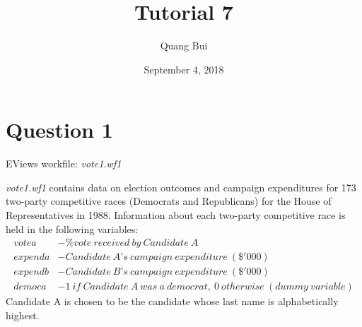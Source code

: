 \documentclass[12pt]{report}
\title{Tutorial 7}
\subtitle
{
	\textbf{keywords}: level log interpretation, dummy variables, hypothesis test, F-test, t-test, p-value, overall significance, individual significance, multiple linear restrictions, reparameterisation
	
	\textbf{estimated reading time}: 35 minutes
}
\author{Quang Bui}
\date{September 4, 2018}
\begin{document}
	
\maketitle

\section*{Question 1}
\noindent EViews workfile: \textit{vote1.wf1}

\noindent \textit{vote1.wf1} contains data on election outcomes and campaign expenditures for 173 two-party competitive races (Democrats and Republicans) for the House of Representatives in 1988. Information about each two-party competitive race is held in the following variables:
\begin{align*}
votea &- \%vote\ received\ by\ Candidate\ A \\
expenda &- Candidate\ A’s\ campaign\ expenditure\ (\$'000) \\
expendb &- Candidate\ B’s\ campaign\ expenditure\ (\$'000) \\
democa &- 1\ if\ Candidate\ A\ was\ a\ democrat,\ 0\ otherwise\ (dummy\ variable)
\end{align*}
\noindent Candidate A is chosen to be the candidate whose last name is alphabetically highest.
\end{document}

